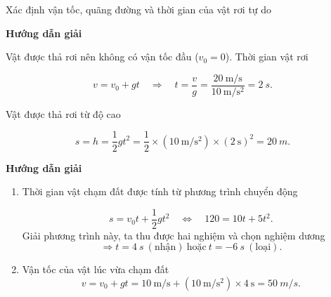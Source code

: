 \begin{dang}{Xác định vận tốc, quãng đường và thời gian của vật rơi tự do}
	{	\begin{center}
			\textbf{Hướng dẫn giải}
		\end{center}
		
		Vật được thả rơi nên không có vận tốc đầu ($v_0=0$). Thời gian vật rơi
		
		$$ v = v_0 +gt \quad\Rightarrow\quad t = \dfrac{v}{g} =\dfrac{\SI{20}{\meter/\second}}{\SI{10}{\meter/\second^2}}= \SI{2}{s}.$$
		
		Vật được thả rơi từ độ cao
		
		$$ s =h = \dfrac{1}{2}gt^2 =\dfrac{1}{2}\times(\SI{10}{\meter/\second^2})\times(\SI{2}{\second})^{2}=\SI{20}{m}.$$
	}
	{	\begin{center}
			\textbf{Hướng dẫn giải}
		\end{center}
		\begin{enumerate}[label=\alph*.]
			\item Thời gian vật chạm đất được tính từ phương trình chuyển động
			
			$$s = v_0t + \dfrac{1}{2}gt^2 \quad\Leftrightarrow\quad 120 = 10t + 5t^2.$$
			Giải phương trình này, ta thu được hai nghiệm và chọn nghiệm dương
			$$\Rightarrow t = \SI{4}{s}\ (\text{nhận})\ \text{hoặc} \ t = -\SI{6}{s}\ (\text{loại}).$$
		
			\item Vận tốc của vật lúc vừa chạm đất
				$$v = v_0 + gt =\SI{10}{\meter/\second}+(\SI{10}{\meter/\second^{2}})\times\SI{4}{\second}= \SI{50}{m/s}.$$
		\end{enumerate}	
	}
\end{dang}
